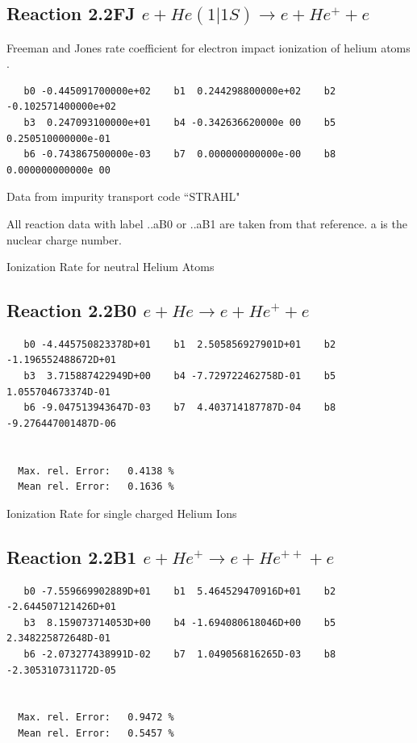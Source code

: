 \documentclass[12pt,dvips]{article}
\begin{document}
\subsection{
Reaction 2.2FJ  $e + He(1|1S) \rightarrow e + He^+ + e$ } Freeman
and Jones rate coefficient for electron impact ionization of helium atoms \cite{kn:Freeman} .

\begin{small}\begin{verbatim}
   b0 -0.445091700000e+02    b1  0.244298800000e+02    b2 -0.102571400000e+02
   b3  0.247093100000e+01    b4 -0.342636620000e 00    b5  0.250510000000e-01
   b6 -0.743867500000e-03    b7  0.000000000000e-00    b8  0.000000000000e 00
\end{verbatim}\end{small}

Data from impurity transport code ``STRAHL" \cite{kn:Behringer}

All reaction data with label ..aB0 or ..aB1 are taken from that
reference. a is the nuclear charge number.

Ionization Rate for neutral Helium Atoms



\subsection{
Reaction 2.2B0   $e + He \rightarrow e + He^+ + e $
}
\begin{small}\begin{verbatim}
   b0 -4.445750823378D+01    b1  2.505856927901D+01    b2 -1.196552488672D+01
   b3  3.715887422949D+00    b4 -7.729722462758D-01    b5  1.055704673374D-01
   b6 -9.047513943647D-03    b7  4.403714187787D-04    b8 -9.276447001487D-06


  Max. rel. Error:   0.4138 %
  Mean rel. Error:   0.1636 %
\end{verbatim}\end{small}

  Ionization Rate for single charged Helium Ions

\subsection{
Reaction 2.2B1   $e + He^+ \rightarrow e + He^{++} + e$
}


\begin{small}\begin{verbatim}
   b0 -7.559669902889D+01    b1  5.464529470916D+01    b2 -2.644507121426D+01
   b3  8.159073714053D+00    b4 -1.694080618046D+00    b5  2.348225872648D-01
   b6 -2.073277438991D-02    b7  1.049056816265D-03    b8 -2.305310731172D-05


  Max. rel. Error:   0.9472 %
  Mean rel. Error:   0.5457 %

\end{verbatim}\end{small}
\end{document}
